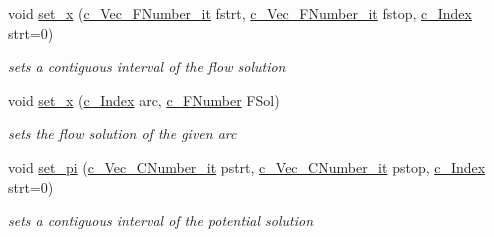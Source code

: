 \begin{Indent}
\begin{DoxyCompactItemize}
void \mbox{\hyperlink{class_s_m_spp__di__unipi__it_1_1_m_c_f_block_af717c8472432c989998153c0f466b69c}{set\+\_\+x}} (\mbox{\hyperlink{class_s_m_spp__di__unipi__it_1_1_m_c_f_block_a2871db0555b42b11ad5315c7f631473b}{c\+\_\+\+Vec\+\_\+\+F\+Number\+\_\+it}} fstrt, \mbox{\hyperlink{class_s_m_spp__di__unipi__it_1_1_m_c_f_block_a2871db0555b42b11ad5315c7f631473b}{c\+\_\+\+Vec\+\_\+\+F\+Number\+\_\+it}} fstop, \mbox{\hyperlink{class_s_m_spp__di__unipi__it_1_1_m_c_f_block_aee6156e2ce80720d57a082d80f39d8cc}{c\+\_\+\+Index}} strt=0)
\begin{DoxyCompactList}\small\item\em sets a contiguous interval of the flow solution \end{DoxyCompactList}\item 
\mbox{\label{class_s_m_spp__di__unipi__it_1_1_m_c_f_block_ab2c311e041849c575ccffd97356e83d5}} 
void \mbox{\hyperlink{class_s_m_spp__di__unipi__it_1_1_m_c_f_block_ab2c311e041849c575ccffd97356e83d5}{set\+\_\+x}} (\mbox{\hyperlink{class_s_m_spp__di__unipi__it_1_1_m_c_f_block_aee6156e2ce80720d57a082d80f39d8cc}{c\+\_\+\+Index}} arc, \mbox{\hyperlink{class_s_m_spp__di__unipi__it_1_1_m_c_f_block_a956c123a5a6b2b52f033ca1987acd80e}{c\+\_\+\+F\+Number}} F\+Sol)
\begin{DoxyCompactList}\small\item\em sets the flow solution of the given arc \end{DoxyCompactList}\item 
void \mbox{\hyperlink{class_s_m_spp__di__unipi__it_1_1_m_c_f_block_adcf617da871dbcb03625164002da6b89}{set\+\_\+pi}} (\mbox{\hyperlink{class_s_m_spp__di__unipi__it_1_1_m_c_f_block_aa2211b659beb942cfb7618c11033831e}{c\+\_\+\+Vec\+\_\+\+C\+Number\+\_\+it}} pstrt, \mbox{\hyperlink{class_s_m_spp__di__unipi__it_1_1_m_c_f_block_aa2211b659beb942cfb7618c11033831e}{c\+\_\+\+Vec\+\_\+\+C\+Number\+\_\+it}} pstop, \mbox{\hyperlink{class_s_m_spp__di__unipi__it_1_1_m_c_f_block_aee6156e2ce80720d57a082d80f39d8cc}{c\+\_\+\+Index}} strt=0)
\begin{DoxyCompactList}\small\item\em sets a contiguous interval of the potential solution \end{DoxyCompactList}\item 
\mbox{\label{class_s_m_spp__di__unipi__it_1_1_m_c_f_block_a4b966ba9e5ad2eec5bf1e1f80f4160fc}} 

\end{DoxyCompactItemize}
\end{Indent}
